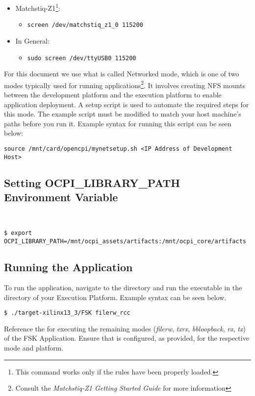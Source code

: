 \begin{flushleft}
\begin{itemize}
\item Matchstiq-Z1\footnote{This command works only if the  rules have been properly loaded.}:
\begin{itemize}
\item[]
\begin{verbatim}
screen /dev/matchstiq_z1_0 115200
\end{verbatim}
\end{itemize}
\end{itemize}

\begin{itemize}
\item In General:
\begin{itemize}
\item[]
\begin{verbatim}
sudo screen /dev/ttyUSB0 115200
\end{verbatim}
\end{itemize}
\end{itemize}

For this document we use what is called Networked mode, which is one of two modes typically used for running applications\footnote{Consult the \textit{Matchstiq-Z1 Getting Started Guide} for more information}. It involves creating NFS mounts between the development platform and the execution platform to enable application deployment. A setup script is used to automate the required steps for this mode. The example script must be modified to match your host machine's paths before you run it. Example syntax for running this script can be seen below:
\begin{verbatim}
source /mnt/card/opencpi/mynetsetup.sh <IP Address of Development Host>
\end{verbatim}
\subsection{Setting OCPI\_LIBRARY\_PATH Environment Variable}
\OcpiLibraryPathBlurb~\\
\begin{verbatim}
$ export OCPI_LIBRARY_PATH=/mnt/ocpi_assets/artifacts:/mnt/ocpi_core/artifacts
\end{verbatim}

\subsection{Running the Application}
To run the application, navigate to the  directory and run the executable in the  directory of your Execution Platform. Example syntax can be seen below.
\begin{verbatim}
$ ./target-xilinx13_3/FSK filerw_rcc
\end{verbatim}
Reference the  for executing the remaining modes (\textit{filerw}, \textit{txrx}, \textit{bbloopback}, \textit{rx}, \textit{tx}) of the FSK Application. Ensure that  is configured, as provided, for the respective mode and platform. \\ \medskip


\end{flushleft}

